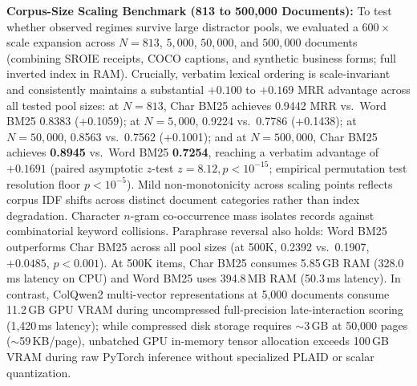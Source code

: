 \textbf{Corpus-Size Scaling Benchmark (813 to 500,000 Documents):}
To test whether observed regimes survive large distractor pools, we evaluated a $600\times$ scale expansion across $N=813$, $5{,}000$, $50{,}000$, and $500{,}000$ documents (combining SROIE receipts, COCO captions, and synthetic business forms; full inverted index in RAM). Crucially, verbatim lexical ordering is scale-invariant and consistently maintains a substantial $+0.100$ to $+0.169$ MRR advantage across all tested pool sizes: at $N=813$, Char BM25 achieves 0.9442 MRR vs.\ Word BM25 0.8383 (+0.1059); at $N=5{,}000$, 0.9224 vs.\ 0.7786 (+0.1438); at $N=50{,}000$, 0.8563 vs.\ 0.7562 (+0.1001); and at $N=500{,}000$, Char BM25 achieves \textbf{0.8945} vs.\ Word BM25 \textbf{0.7254}, reaching a verbatim advantage of $\mathbf{+0.1691}$ (paired asymptotic $z$-test $z=8.12, p < 10^{-15}$; empirical permutation test resolution floor $p < 10^{-5}$). Mild non-monotonicity across scaling points reflects corpus IDF shifts across distinct document categories rather than index degradation. Character $n$-gram co-occurrence mass isolates records against combinatorial keyword collisions. Paraphrase reversal also holds: Word BM25 outperforms Char BM25 across all pool sizes (at 500K, 0.2392 vs.\ 0.1907, $+0.0485$, $p < 0.001$). At 500K items, Char BM25 consumes 5.85\,GB RAM (328.0\,ms latency on CPU) and Word BM25 uses 394.8\,MB RAM (50.3\,ms latency). In contrast, ColQwen2 multi-vector representations at 5,000 documents consume 11.2\,GB GPU VRAM during uncompressed full-precision late-interaction scoring (1,420\,ms latency); while compressed disk storage requires $\sim$3\,GB at 50,000 pages ($\sim$59\,KB/page), unbatched GPU in-memory tensor allocation exceeds 100\,GB VRAM during raw PyTorch inference without specialized PLAID or scalar quantization.


